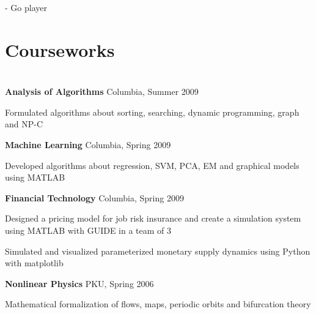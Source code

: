 \documentclass[margin,line]{resume}
\begin{document}
\begin{resume}
	- Go player
      
    \section{\mysidestyle Courseworks}

    \section{\mysidestyle [Algorithm]}

    \textbf{Analysis of Algorithms} \hfill Columbia, Summer 2009 \vspace{-3mm}\\\vspace{-1mm}%
      \begin{list2}
      \item Formulated algorithms about sorting, searching, dynamic programming, graph and NP-C
      \end{list2}
    
    \textbf{Machine Learning} \hfill Columbia, Spring 2009 \vspace{-3mm}\\\vspace{-1mm}%
      \begin{list2}
      \item Developed algorithms about regression, SVM, PCA, EM and graphical models using MATLAB 
      \end{list2}

    \textbf{Financial Technology} \hfill Columbia, Spring 2009 \vspace{-3mm}\\\vspace{-1mm}%
      \begin{list2}
      \item Designed a pricing model for job risk insurance and create a simulation system using MATLAB with GUIDE in a team of 3 
      \item Simulated and visualized parameterized monetary supply dynamics using Python with matplotlib 
      \end{list2}

    \textbf{Nonlinear Physics} \hfill PKU, Spring 2006  \vspace{-3mm}\\\vspace{-1mm}%
      \begin{list2}
      \item Mathematical formalization of flows, maps, periodic orbits and bifurcation theory 
      \end{list2}


\end{resume}
\end{document}
